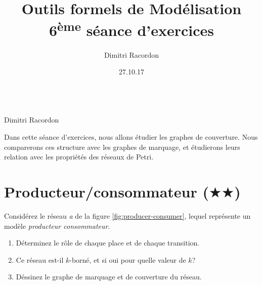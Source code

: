 \documentclass[a4paper, titlepage]{article}
\makeatletter
\newcommand\objective[1]{\def\@objective{#1}}
\newcommand{\makecustomtitle}{%
	\begin{center}
		\huge\@title \\
		[1ex]\small Dimitri Racordon \\ \@date
	\end{center}
	\@objective
}
\makeatother
\begin{document}
\title{Outils formels de Modélisation \\ 6\textsuperscript{ème} séance d'exercices}
\author{Dimitri Racordon}
\date{27.10.17}
\objective{
  Dans cette séance d'exercices,
  nous allons étudier les graphes de couverture.
  Nous comparerons ces structure avec les graphes de marquage,
  et étudierons leurs relation avec les propriétés des réseaux de Petri.
}

\makecustomtitle

\section{Producteur/consommateur ($\bigstar\bigstar$)}

Considérez le réseau \emph{a} de la figure \ref{fig:producer-consumer},
lequel représente un modèle \emph{producteur consommateur}.

\begin{enumerate}
  \item Déterminez le rôle de chaque place et de chaque transition.
  \item Ce réseau est-il $k$-borné, et si oui pour quelle valeur de $k$?
  \item Déssinez le graphe de marquage et de couverture du réseau.
\end{enumerate}
\end{document}

